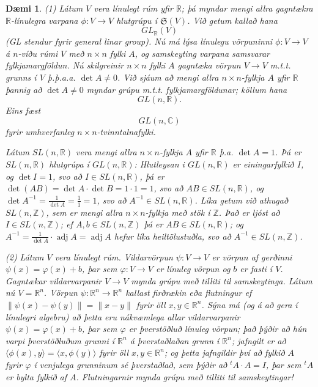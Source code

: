 \documentclass[a4paper,icelandic,11pt]{book}
\theoremstyle{plain}
\newtheorem{daemi}{Dæmi}[chapter]
\newcommand{\R}{\mathbb{R}}
\newcommand{\Z}{\mathbb{Z}}
\newcommand{\C}{\mathbb{C}}
\DeclareMathOperator{\adj}{adj} %
\begin{document}
\begin{daemi} 

  (1) Látum $V$ vera línulegt rúm yfir $\R$; þá myndar mengi allra gagntækra
  $\R$\emph{-línulegra} varpana
  $\phi : V \to V$ hlutgrúpu í $\mathfrak S(V)$.
  Við getum kallað hana \[ GL_\R (V) \] (GL stendur fyrir \emph{general linar
  group}). Nú má lýsa línulegu vörpuninni $\phi : V\to V$ á $n$-víðu rúmi $V$
  með $n\times n$ fylki $A$, og samskeyting varpana samsvarar fylkjamargföldun.
  Nú skilgreinir $n\times n$ fylki $A$ gagntæka vörpun $V\to V$ m.t.t. grunns í
  $V$ þ.þ.a.a. $\det A \neq 0$. Við sjáum að mengi allra $n\times n$-fylkja $A$
  yfir $\R$ þannig að $\det A \neq 0$ myndar grúpu m.t.t. fylkjamargföldunar;
  köllum hana \[ GL(n,\R) .\] Eins fæst \[ GL(n,\C) \] fyrir umhverfanleg
  $n\times n$-tvinntalnafylki.

  Látum $SL(n,\R)$ vera mengi allra $n\times n$-fylkja $A$ yfir $\R$ þ.a.  $\det
  A = 1$. Þá er $SL(n,\R)$ hlutgrúpa í $GL(n,\R)$: Hlutleysan i $GL(n,\R)$ er
  einingarfylkið $I$, og $\det I = 1$, svo að $I\in SL(n,\R)$, þá er $\det (AB)
  = \det A\cdot \det B = 1\cdot 1 = 1$, svo að $AB\in SL(n,\R)$, og $\det A^{-1}
  = \frac 1{\det A} = \frac 11 = 1$, svo að $A^{-1} \in SL(n,\R)$. Líka getum
  við athugað $SL(n,\Z)$, sem er mengi allra $n\times n$-fylkja með stök í $\Z$.
  Það er ljóst að $I\in SL(n,\Z)$; ef $A,b\in SL(n,\Z)$ þá er $AB\in SL(n,\R)$;
  og $A^{-1} = \frac 1{\det A} \cdot \adj A = \adj A$ hefur líka heiltölustuðla,
  svo að $A^{-1}\in SL(n,\Z)$.

  (2) Látum $V$ vera línulegt rúm. \emph{Vildarvörpun}
  $\psi:V\to V$ er vörpun
  af gerðinni $\psi(x) = \varphi(x) + b$, þar sem $\varphi: V\to V$ er línuleg
  vörpun og $b$ er fasti í $V$. \emph{Gagntækar} vildarvarpanir $V\to V$ mynda
  grúpu með tilliti til samskeytinga. Látum nú $V = \R^n$.  Vörpun $\psi : \R^n
  \to \R^n $ kallast \emph{firðrækin}
  eða \emph{flutningur} ef $\| \psi(x) -
  \psi (y) \| = \| x-y\|$ fyrir öll $x,y\in \R^n$. Sýna má (og á að gera í
  línulegri algebru) að þetta eru nákvæmlega allar vildarvarpanir $\psi (x) =
  \varphi(x) + b$, þar sem $\varphi$ er
  \emph{þverstöðluð} línuleg
  vörpun; það þýðir að hún varpi þverstöðluðum grunni í $\R^n$ á þverstaðlaðan
  grunn í $\R^n$; jafngilt er að $\langle \phi(x), y\rangle = \langle x,\phi
  (y)\rangle$ fyrir öll $x,y\in\R^n$; og þetta jafngildir því að fylkið $A$
  fyrir $\varphi$ í venjulega grunninum sé þverstaðlað, sem þýðir að $^t A\cdot
  A = I$, þar sem $^t A$ er bylta fylkið af $A$. Flutningarnir mynda grúpu með
  tilliti til samskeytingar!


\end{daemi}
\end{document}
